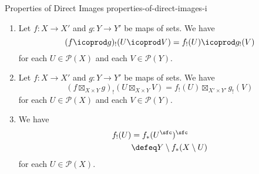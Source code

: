 \begin{proposition}{Properties of Direct Images \rmI}{properties-of-direct-images-i}
\begin{enumerate}
            \[
                (f_{!},f^{\otimes}_{!},f^{\otimes}_{*|\Unit})
                \colon
                (\mathcal{P}(X),\cap,X)
                \to
                (\mathcal{P}(Y),\cap,Y),
            \]%
            being equipped with inclusions%
            \[
                \begin{gathered}
                    f^{\otimes}_{*|U,V}   \colon f_{!}(U\cap V) \hookrightarrow f_{!}(U)\cap f_{!}(V),\\
                    f^{\otimes}_{*|\Unit} \colon f_{!}(X)       \hookrightarrow Y,
                \end{gathered}
            \]%
            natural in $U,V\in\mathcal{P}(X)$.
        \item\label{properties-of-direct-images-i-interaction-with-coproducts}Let $f\colon X\to X'$ and $g\colon Y\to Y'$ be maps of sets. We have
            \[
                (f\icoprod g)_{!}(U\icoprod V)%
                =%
                f_{!}(U)\icoprod g_{!}(V)%
            \]%
            for each $U\in\mathcal{P}(X)$ and each $V\in\mathcal{P}(Y)$.
        \item\label{properties-of-direct-images-i-interaction-with-products}Let $f\colon X\to X'$ and $g\colon Y\to Y'$ be maps of sets. We have
            \[
                (f\boxtimes_{X\times Y} g)_{!}(U\boxtimes_{X\times Y}V)%
                =%
                f_{!}(U)\boxtimes_{X'\times Y'}g_{!}(V)%
            \]%
            for each $U\in\mathcal{P}(X)$ and each $V\in\mathcal{P}(Y)$.
        \item\label{properties-of-direct-images-i-relation-to-codirect-images}We have
            \begin{align*}
                f_{!}(U) &=      f_{*}(U^{\sfc})^{\sfc}\\%
                         &\defeq Y\setminus f_{*}(X\setminus U)%
            \end{align*}
            for each $U\in\mathcal{P}(X)$.
    \end{enumerate}
\end{proposition}
